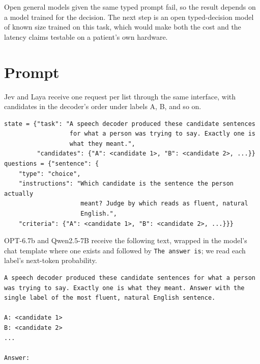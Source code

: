 \documentclass[11pt]{article}
\begin{document}
Open general models given the same typed prompt fail, so the result depends on a model
trained for the decision. The next step is an open typed-decision model of known size
trained on this task, which would make both the cost and the latency claims testable on a
patient's own hardware.

\appendix

\section{Prompt}
\label{app:prompt}

Jev and Laya receive one request per list through the same interface, with candidates in
the decoder's order under labels A, B, and so on.

{\small
\begin{verbatim}
state = {"task": "A speech decoder produced these candidate sentences
                  for what a person was trying to say. Exactly one is
                  what they meant.",
         "candidates": {"A": <candidate 1>, "B": <candidate 2>, ...}}
questions = {"sentence": {
    "type": "choice",
    "instructions": "Which candidate is the sentence the person actually
                     meant? Judge by which reads as fluent, natural
                     English.",
    "criteria": {"A": <candidate 1>, "B": <candidate 2>, ...}}}
\end{verbatim}}

\noindent OPT-6.7b and Qwen2.5-7B receive the following text, wrapped in the model's chat
template where one exists and followed by \texttt{The answer is}; we read each label's
next-token probability.

{\small
\begin{verbatim}
A speech decoder produced these candidate sentences for what a person
was trying to say. Exactly one is what they meant. Answer with the
single label of the most fluent, natural English sentence.

A: <candidate 1>
B: <candidate 2>
...

Answer:
\end{verbatim}}
\end{document}
